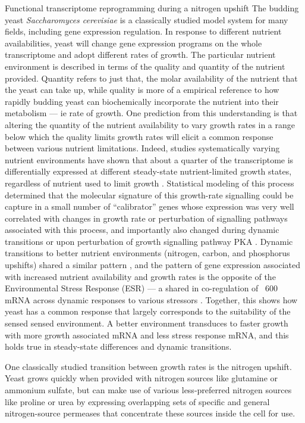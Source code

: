 Functional transcriptome reprogramming during a
nitrogen upshift The budding yeast \textit{Saccharomyces cerevisiae}
is a
classically studied model system for many fields, including gene
expression regulation. In response to different nutrient
availabilities, yeast will change gene expression programs on the
whole transcriptome and adopt different rates of growth. The
particular nutrient environment is described in terms of the quality
and quantity of the nutrient provided. Quantity refers to just that,
the molar availability of the nutrient that the yeast can take up,
while quality is more of a empirical reference to how rapidly budding
yeast can biochemically incorporate the nutrient into their metabolism
--- ie rate of growth. One prediction from this understanding is that
altering the quantity of the nutrient availability to vary growth
rates in a range below which the quality limits growth rates will
elicit a common response between various nutrient limitations.
Indeed, studies systematically varying nutrient environments have
shown that about a quarter of the transcriptome is differentially
expressed at different steady-state nutrient-limited growth states,
regardless of nutrient used to limit growth 
\parencite{brauer2008coordination,regenberg2006growth}. 
Statistical modeling of this process
determined that the molecular signature of this growth-rate signalling
could be capture in a small number of “calibrator” genes whose
expression was very well correlated with changes in growth rate or
perturbation of signalling pathways associated with this process, and
importantly also changed during dynamic transitions or upon
perturbation of growth signalling pathway PKA 
\parencite{airoldi2009predicting}.
Dynamic transitions to better nutrient environments (nitrogen, carbon,
and phosphorus upshifts) shared a similar pattern 
\parencite{conway2012glucose}, 
and the pattern of gene expression associated with increased
nutrient availability and growth rates is the opposite of the
Environmental Stress Response (ESR) --- a shared in co-regulation of
~600 mRNA across dynamic responses to various stressors 
\parencite{gasch2000genomic}. 
Together, this shows how yeast has a common response that
largely corresponds to the suitability of the sensed sensed
environment. A better environment transduces to faster growth with
more growth associated mRNA and less stress response mRNA, and this
holds true in steady-state differences and dynamic transitions.  

One
classically studied transition between growth rates is the nitrogen
upshift. Yeast grows quickly when provided with nitrogen sources like
glutamine or ammonium sulfate, but can make use of various
less-preferred nitrogen sources like proline or urea by expressing
overlapping sets of specific and general nitrogen-source permeases
that concentrate these sources inside the cell for use.  

